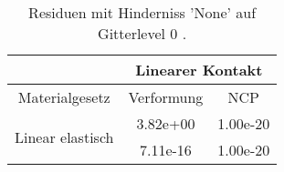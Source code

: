\begin{table} 
\centering 
\begin{tabular}{c|cc|} 
\cline{2-3} 
 & \multicolumn{2}{|c|}{Linearer Kontakt} \\ 
\hline 
\multicolumn{1}{|c|}{Materialgesetz} & \multicolumn{1}{c|}{Verformung} & \multicolumn{1}{c|}{NCP} \\ 
\hline 
\multicolumn{1}{|c|}{\multirow{2}{*}{Linear elastisch}} &\multicolumn{1}{|c|}{  3.82e+00} & \multicolumn{1}{|c|}{  1.00e-20} \\ 
\multicolumn{1}{|c|}{} & \multicolumn{1}{|c|}{  7.11e-16} & \multicolumn{1}{|c|}{  1.00e-20} \\ 
\hline 
\end{tabular}\caption{Residuen mit Hinderniss 'None' auf Gitterlevel 0 .}\label{tab:Residuum_None_level0}
\end{table} 
